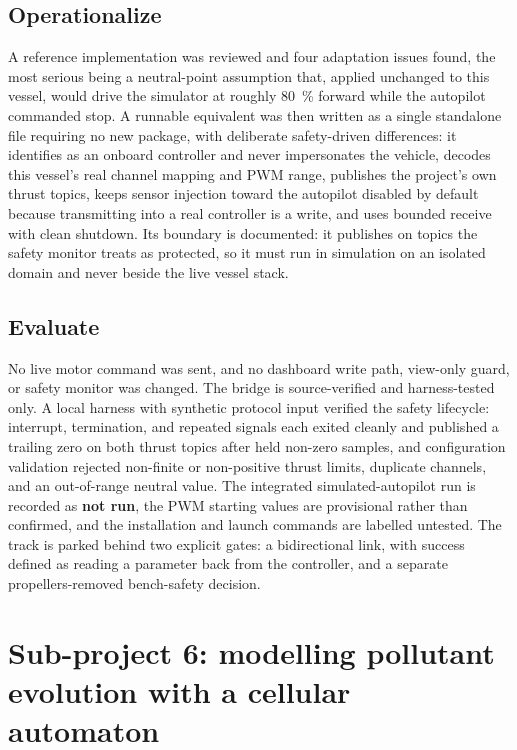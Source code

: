 \documentclass[a4paper,12pt,oneside,openany]{report}
\begin{document}
\subsection{Operationalize}

A reference implementation was reviewed and four adaptation issues found, the most serious being a
neutral-point assumption that, applied unchanged to this vessel, would drive the simulator at
roughly 80~\% forward while the autopilot commanded stop. A runnable equivalent was then written as
a single standalone file requiring no new package, with deliberate safety-driven differences: it
identifies as an onboard controller and never impersonates the vehicle, decodes this vessel's real
channel mapping and PWM range, publishes the project's own thrust topics, keeps sensor injection
toward the autopilot disabled by default because transmitting into a real controller is a write, and
uses bounded receive with clean shutdown. Its boundary is documented: it publishes on topics the
safety monitor treats as protected, so it must run in simulation on an isolated domain and never
beside the live vessel stack.

\subsection{Evaluate}

No live motor command was sent, and no dashboard write path, view-only guard, or safety monitor was
changed. The bridge is source-verified and harness-tested only. A local harness with synthetic
protocol input verified the safety lifecycle: interrupt, termination, and repeated signals each
exited cleanly and published a trailing zero on both thrust topics after held non-zero samples, and
configuration validation rejected non-finite or non-positive thrust limits, duplicate channels, and
an out-of-range neutral value. The integrated simulated-autopilot run is recorded as \textbf{not
run}, the PWM starting values are provisional rather than confirmed, and the installation and launch
commands are labelled untested. The track is parked behind two explicit gates: a bidirectional link,
with success defined as reading a parameter back from the controller, and a separate
propellers-removed bench-safety decision.

\section{Sub-project 6: modelling pollutant evolution with a cellular automaton}
\label{sec:sub-ca}
\end{document}
